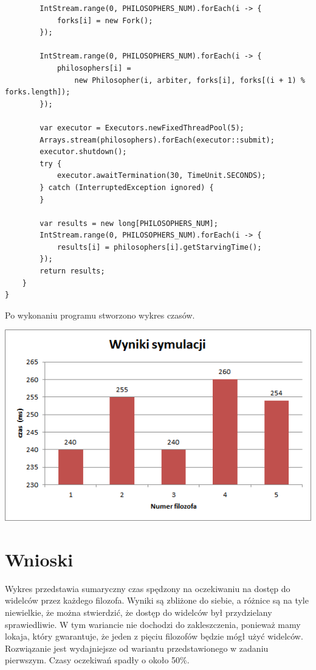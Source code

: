 \documentclass[12pt]{article}
\begin{document}
\begin{verbatim}
        IntStream.range(0, PHILOSOPHERS_NUM).forEach(i -> {
            forks[i] = new Fork();
        });

        IntStream.range(0, PHILOSOPHERS_NUM).forEach(i -> {
            philosophers[i] = 
                new Philosopher(i, arbiter, forks[i], forks[(i + 1) % forks.length]);
        });

        var executor = Executors.newFixedThreadPool(5);
        Arrays.stream(philosophers).forEach(executor::submit);
        executor.shutdown();
        try {
            executor.awaitTermination(30, TimeUnit.SECONDS);
        } catch (InterruptedException ignored) {
        }

        var results = new long[PHILOSOPHERS_NUM];
        IntStream.range(0, PHILOSOPHERS_NUM).forEach(i -> {
            results[i] = philosophers[i].getStarvingTime();
        });
        return results;
    }
}

\end{verbatim}


Po wykonaniu programu stworzono wykres czasów.
\begin{center}
\centering
    \includegraphics{philosophers_arbiter.png}
\end{center}


\section{Wnioski}
Wykres przedstawia sumaryczny czas spędzony na oczekiwaniu na dostęp do widelców przez każdego filozofa. Wyniki są zbliżone do siebie, a różnice są na tyle niewielkie, że można stwierdzić, że dostęp do widelców był przydzielany sprawiedliwie. W tym wariancie nie dochodzi do zakleszczenia, ponieważ mamy lokaja, który gwarantuje, że jeden z pięciu filozofów będzie mógł użyć widelców. Rozwiązanie jest wydajniejsze od wariantu przedstawionego w zadaniu pierwszym. Czasy oczekiwań spadły o około 50\%.
\end{document}

